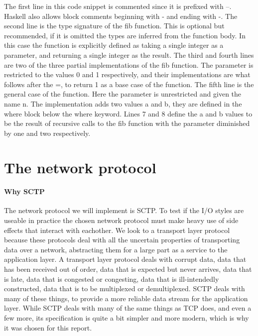 The first line in this code snippet is commented since it is prefixed with --. Haskell also allows block comments beginning with {- and ending with -}.
The second line is the type signature of the fib function. This is optional but recommended, if it is omitted the types are inferred from the function body. In this case the function is explicitly defined as taking a single integer as a parameter, and returning a single integer as the result.
The third and fourth lines are two of the three partial implementations of the fib function.  The parameter is restricted to the values 0 and 1 respectively, and their implementations are what follows after the =, to return 1 as a base case of the function.
The fifth line is the general case of the function. Here the parameter is unrestricted and given the name n. The implementation adds two values a and b, they are defined in the where block below the where keyword.
Lines 7 and 8 define the a and b values to be the result of recursive calls to the fib function with the parameter diminished by one and two respectively.
\section{The network protocol}
\paragraph{Why SCTP}
The network protocol we will implement is SCTP.
To test if the I/O styles are useable in practice the chosen network protocol must make heavy use of side effects that interact with eachother.
We look to a transport layer protocol because these protocols deal with all the uncertain properties of transporting data over a network, abstracting them for a large part as a service to the application layer.
A transport layer protocol deals with corrupt data, data that has been received out of order, data that is expected but never arrives, data that is late, data that is congested or congesting, data that is ill-intendedly constructed, data that is to be multiplexed or demultiplexed.
SCTP deals with many of these things, to provide a more reliable data stream for the application layer.
While SCTP deals with many of the same things as TCP does, and even a few more, its specification is quite a bit simpler and more modern, which is why it was chosen for this report.
